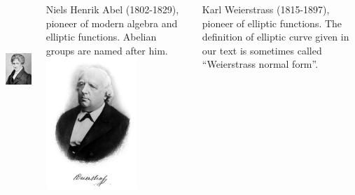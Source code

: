 \begin{frame}
\begin{columns}[T]
\includegraphics[height=5cm]{../../modules/crypto-digital-signature-algorithm/images/NielsHenrikAbel.jpg}

Niels Henrik Abel (1802-1829), pioneer of modern algebra and elliptic functions. Abelian groups are named after him.
\includegraphics[height=5cm]{../../modules/crypto-digital-signature-algorithm/images/KarlWeierstrass.jpg}

Karl Weierstrass (1815-1897), pioneer of elliptic functions. The definition of elliptic curve given in our text is sometimes called ``Weierstrass normal form''.

\end{columns}
\end{frame}